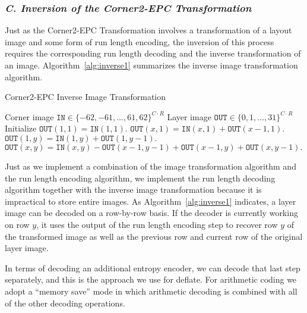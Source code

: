 \documentclass{article}
\begin{document}
\subsubsection*{{\em C. Inversion of the Corner2-EPC Transformation}}
Just as the Corner2-EPC Transformation involves a transformation of a
layout image and some form of run length encoding, the inversion of this
process requires the corresponding run length decoding and the inverse
transformation of an image.  Algorithm~\ref{alg:inverse1} summarizes
the inverse image transformation algorithm.

\begin{algorithm}[!htb]
\caption{Corner2-EPC Inverse Image Transformation}
\label{alg:inverse1}
\begin{algorithmic}[1]
\renewcommand{\algorithmicrequire} {\textbf{Input:}}
\REQUIRE Corner image $\texttt{IN} \in \{-62, -61, \dots , 61, 62 \}^{C \cdot R}$
\renewcommand{\algorithmicrequire} {\textbf{Output:}}
\REQUIRE Layer image $\texttt{OUT} \in \{0, 1, \dots , 31\}^{C \cdot R}$
\STATE Initialize $\texttt{OUT}(1,1)= \texttt{IN}(1,1).$
        \STATE $\texttt{OUT}(x,1)= \texttt{IN}(x,1) + \texttt{OUT}(x-1,1).$
\ENDFOR
{}
        \STATE $\texttt{OUT}(1,y)= \texttt{IN}(1,y) + \texttt{OUT}(1,y-1).$
        \STATE $\texttt{OUT}(x,y)= \texttt{IN}(x,y) - \texttt{OUT}(x-1,y-1) + \texttt{OUT}(x-1,y) + \texttt{OUT}(x,y-1).$
        \ENDFOR
\ENDFOR
\end{algorithmic}
\end{algorithm}

Just as we implement a combination of the image transformation algorithm
and the run length encoding algorithm, we implement the run length decoding
algorithm together with the inverse image transformation because it is
impractical to store entire images.  As Algorithm~\ref{alg:inverse1} indicates,
a layer image can be decoded on a row-by-row basis.  If the decoder
is currently working on row $y$, it uses the output of the run length
encoding step to recover row $y$ of the transformed image as well as the
previous row and current row of the original layer image.

In terms of decoding an additional entropy encoder, we can decode that
last step separately, and this is the approach we use for deflate.
For arithmetic coding we adopt a ``memory save'' mode in which arithmetic
decoding  is combined with all of the other decoding operations.
\end{document}

